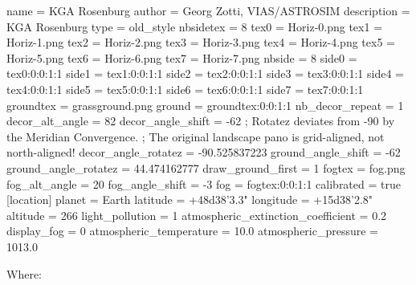 \begin{configfile}
[landscape]
name = KGA Rosenburg
author = Georg Zotti, VIAS/ASTROSIM
description = KGA Rosenburg
type = old_style
nbsidetex = 8
tex0 = Horiz-0.png
tex1 = Horiz-1.png
tex2 = Horiz-2.png
tex3 = Horiz-3.png
tex4 = Horiz-4.png
tex5 = Horiz-5.png
tex6 = Horiz-6.png
tex7 = Horiz-7.png
nbside = 8
side0 = tex0:0:0:1:1
side1 = tex1:0:0:1:1
side2 = tex2:0:0:1:1
side3 = tex3:0:0:1:1
side4 = tex4:0:0:1:1
side5 = tex5:0:0:1:1
side6 = tex6:0:0:1:1
side7 = tex7:0:0:1:1
groundtex = grassground.png
ground = groundtex:0:0:1:1
nb_decor_repeat = 1
decor_alt_angle =  82
decor_angle_shift = -62
; Rotatez deviates from -90 by the Meridian Convergence. 
; The original landscape pano is grid-aligned, not north-aligned!
decor_angle_rotatez =  -90.525837223
ground_angle_shift = -62
ground_angle_rotatez =  44.474162777
draw_ground_first = 1
fogtex = fog.png
fog_alt_angle = 20
fog_angle_shift = -3
fog = fogtex:0:0:1:1
calibrated = true
[location]
planet = Earth
latitude = +48d38'3.3"
longitude = +15d38'2.8"
altitude = 266
light_pollution = 1
atmospheric_extinction_coefficient = 0.2
display_fog = 0
atmospheric_temperature = 10.0
atmospheric_pressure = 1013.0
\end{configfile}
%
Where:
